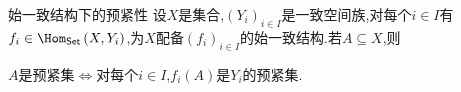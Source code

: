 \begin{proposition}{始一致结构下的预紧性}{}
	设$X$是集合,$\left(Y_{i}\right)_{i\in I}$是一致空间族,对每个$i\in I$有$f_{i}\in\Hom_{\mathsf{Set}}\left(X,Y_{i}\right)$,为$X$配备$\left(f_{i}\right)_{i\in I}$的始一致结构.若$A\subseteq X$,则
	\begin{center}
		$A$是预紧集$\iff$对每个$i\in I$,$f_{i}\left(A\right)$是$Y_{i}$的预紧集.
	\end{center}
\end{proposition}



